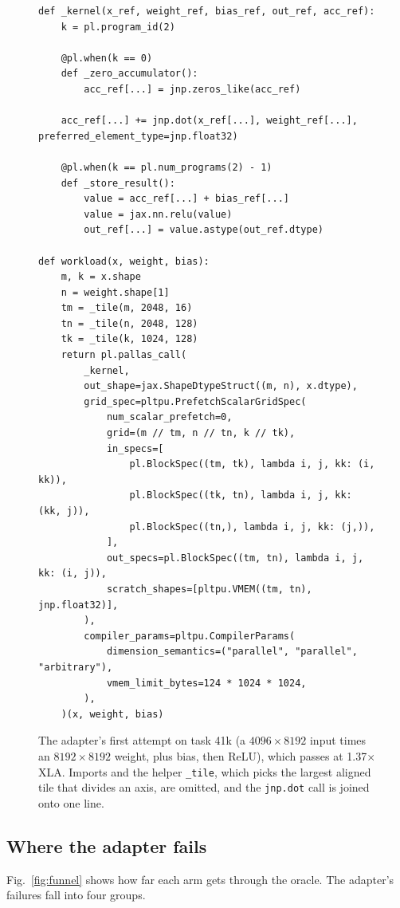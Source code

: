 \documentclass[conference]{IEEEtran}
\newcommand{\x}{$\times$}
\begin{document}
\begin{figure}[t]
\begin{lstlisting}
def _kernel(x_ref, weight_ref, bias_ref, out_ref, acc_ref):
    k = pl.program_id(2)

    @pl.when(k == 0)
    def _zero_accumulator():
        acc_ref[...] = jnp.zeros_like(acc_ref)

    acc_ref[...] += jnp.dot(x_ref[...], weight_ref[...], preferred_element_type=jnp.float32)

    @pl.when(k == pl.num_programs(2) - 1)
    def _store_result():
        value = acc_ref[...] + bias_ref[...]
        value = jax.nn.relu(value)
        out_ref[...] = value.astype(out_ref.dtype)

def workload(x, weight, bias):
    m, k = x.shape
    n = weight.shape[1]
    tm = _tile(m, 2048, 16)
    tn = _tile(n, 2048, 128)
    tk = _tile(k, 1024, 128)
    return pl.pallas_call(
        _kernel,
        out_shape=jax.ShapeDtypeStruct((m, n), x.dtype),
        grid_spec=pltpu.PrefetchScalarGridSpec(
            num_scalar_prefetch=0,
            grid=(m // tm, n // tn, k // tk),
            in_specs=[
                pl.BlockSpec((tm, tk), lambda i, j, kk: (i, kk)),
                pl.BlockSpec((tk, tn), lambda i, j, kk: (kk, j)),
                pl.BlockSpec((tn,), lambda i, j, kk: (j,)),
            ],
            out_specs=pl.BlockSpec((tm, tn), lambda i, j, kk: (i, j)),
            scratch_shapes=[pltpu.VMEM((tm, tn), jnp.float32)],
        ),
        compiler_params=pltpu.CompilerParams(
            dimension_semantics=("parallel", "parallel", "arbitrary"),
            vmem_limit_bytes=124 * 1024 * 1024,
        ),
    )(x, weight, bias)
\end{lstlisting}
\caption{The adapter's first attempt on task 41k (a $4096 \times 8192$ input times an $8192 \times 8192$ weight, plus bias,
then ReLU), which passes at 1.37\x{} XLA. Imports and the helper \texttt{\_tile}, which picks the largest aligned tile that
divides an axis, are omitted, and the \texttt{jnp.dot} call is joined onto one line.}
\label{fig:listing}
\end{figure}

\subsection{Where the adapter fails}

Fig.~\ref{fig:funnel} shows how far each arm gets through the oracle. The adapter's failures fall into four groups.
\end{document}
